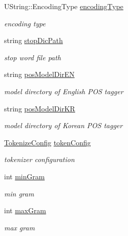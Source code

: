 \begin{CompactItemize}
UString::EncodingType \hyperlink{classla__manager_1_1LAConfiguration_5b41d31f3e921fc03a111ff0162f36a7}{encodingType}
\begin{CompactList}\small\item\em encoding type \item\end{CompactList}\item 
string \hyperlink{classla__manager_1_1LAConfiguration_742018fadbd178f65c971474765fc1e4}{stopDicPath}
\begin{CompactList}\small\item\em stop word file path \item\end{CompactList}\item 
string \hyperlink{classla__manager_1_1LAConfiguration_4fa8698f13d1fe2c9b946b12093e904a}{posModelDirEN}
\begin{CompactList}\small\item\em model directory of English POS tagger \item\end{CompactList}\item 
string \hyperlink{classla__manager_1_1LAConfiguration_b25c9b6b37231ef0cdf95bf482275a05}{posModelDirKR}
\begin{CompactList}\small\item\em model directory of Korean POS tagger \item\end{CompactList}\item 
\hyperlink{classla__manager_1_1TokenizeConfig}{TokenizeConfig} \hyperlink{classla__manager_1_1LAConfiguration_3f916f330bfc6dc84ea5db64e4e2a75c}{tokenConfig}
\begin{CompactList}\small\item\em tokenizer configuration \item\end{CompactList}\item 
int \hyperlink{classla__manager_1_1LAConfiguration_f9d261511f52e4fd17b382bdfc03bab4}{minGram}
\begin{CompactList}\small\item\em min gram \item\end{CompactList}\item 
int \hyperlink{classla__manager_1_1LAConfiguration_79b4e876fd224ec224b5572dfcc9ba6c}{maxGram}
\begin{CompactList}\small\item\em max gram \item\end{CompactList}\item 

\end{CompactItemize}
